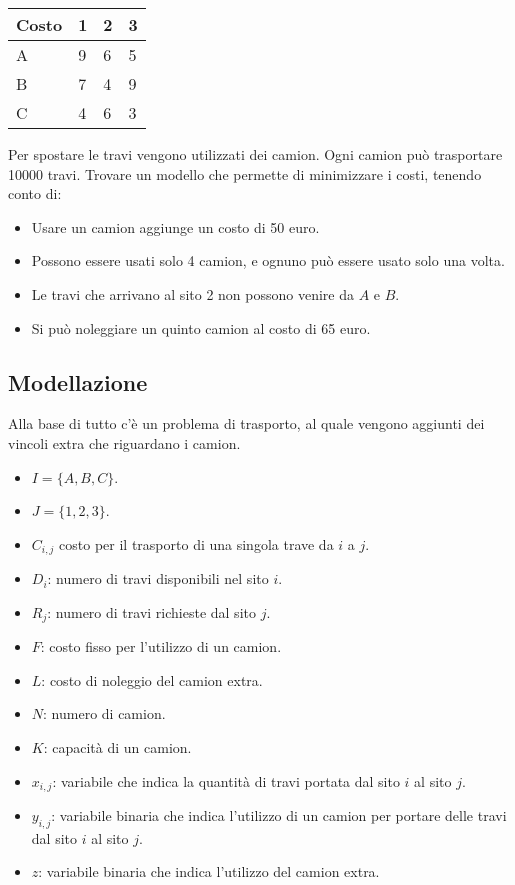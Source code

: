 \begin{table}[htbp]
	\centering
	\begin{tabular}{|l|l|l|l|}
		\hline
		Costo & 1 & 2 & 3 \\ \hline
		A    & 9 & 6 & 5 \\ \hline
		B    & 7 & 4 & 9 \\ \hline
		C    & 4 & 6 & 3 \\ \hline
	\end{tabular}
\end{table}

Per spostare le travi vengono utilizzati dei camion. Ogni camion può trasportare 10000 travi.
Trovare un modello che permette di minimizzare i costi, tenendo conto di:

\begin{itemize}
	\item Usare un camion aggiunge un costo di 50 euro.
	\item Possono essere usati solo 4 camion, e ognuno può essere usato solo una volta.
	\item Le travi che arrivano al sito 2 non possono venire da $A$ e $B$.
	\item Si può noleggiare un quinto camion al costo di 65 euro.
\end{itemize} 

\subsection{Modellazione}

Alla base di tutto c'è un problema di trasporto, al quale vengono aggiunti dei vincoli extra che riguardano i camion.

\begin{itemize}
	\item $I = \{A, B, C\}$.
	\item $J = \{1,2,3\}$.
	\item $C_{i,j}$ costo per il trasporto di una singola trave da $i$ a $j$.
	\item $D_i$: numero di travi disponibili nel sito $i$.
	\item $R_j$: numero di travi richieste dal sito $j$.
	\item $F$: costo fisso per l'utilizzo di un camion.
	\item $L$: costo di noleggio del camion extra.
	\item $N$: numero di camion.
	\item $K$: capacità di un camion.
	\item $x_{i,j}$: variabile che indica la quantità di travi portata dal sito $i$ al sito $j$.
	\item $y_{i,j}$: variabile binaria che indica l'utilizzo di un camion per portare delle travi dal sito $i$ al sito $j$.
	\item $z$: variabile binaria che indica l'utilizzo del camion extra.
\end{itemize}

